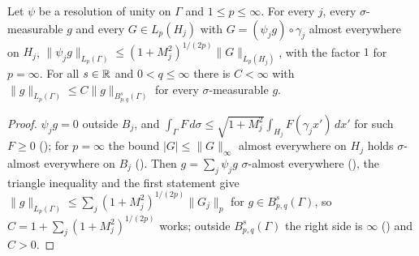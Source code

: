 \begin{lemma}
\label{lem:boundary-besov-lp}
\leanok
{}
Let $\psi$ be a resolution of unity on $\Gamma$ and $1 \leq p \leq \infty$. For every $j$, every
$\sigma$-measurable $g$ and every $G \in L_p(H_j)$ with $G = (\psi_j g) \circ \gamma_j$ almost
everywhere on $H_j$,
$\|\psi_j g\|_{L_p(\Gamma)} \leq (1 + M_j^2)^{1/(2p)} \|G\|_{L_p(H_j)}$, with the factor $1$ for
$p = \infty$. For all $s \in \mathbb{R}$ and $0 < q \leq \infty$ there is $C < \infty$ with
$\|g\|_{L_p(\Gamma)} \leq C \|g\|_{B^s_{p,q}(\Gamma)}$ for every $\sigma$-measurable $g$.
\end{lemma}

\begin{proof}
\leanok
$\psi_j g = 0$ outside $B_j$, and $\int_\Gamma F \, d\sigma \leq \sqrt{1 + M_j^2} \int_{H_j}
F(\gamma_j x') \, dx'$ for such $F \geq 0$ (); for
$p = \infty$ the bound $|G| \leq \|G\|_\infty$ almost everywhere on $H_j$ holds
$\sigma$-almost everywhere on $B_j$ (). Then
$g = \sum_j \psi_j g$ $\sigma$-almost everywhere (), the
triangle inequality and the first statement give
$\|g\|_{L_p(\Gamma)} \leq \sum_j (1 + M_j^2)^{1/(2p)} \|G_j\|_p$ for $g \in B^s_{p,q}(\Gamma)$, so
$C = 1 + \sum_j (1 + M_j^2)^{1/(2p)}$ works; outside $B^s_{p,q}(\Gamma)$ the right side is
$\infty$ () and $C > 0$.
\end{proof}

